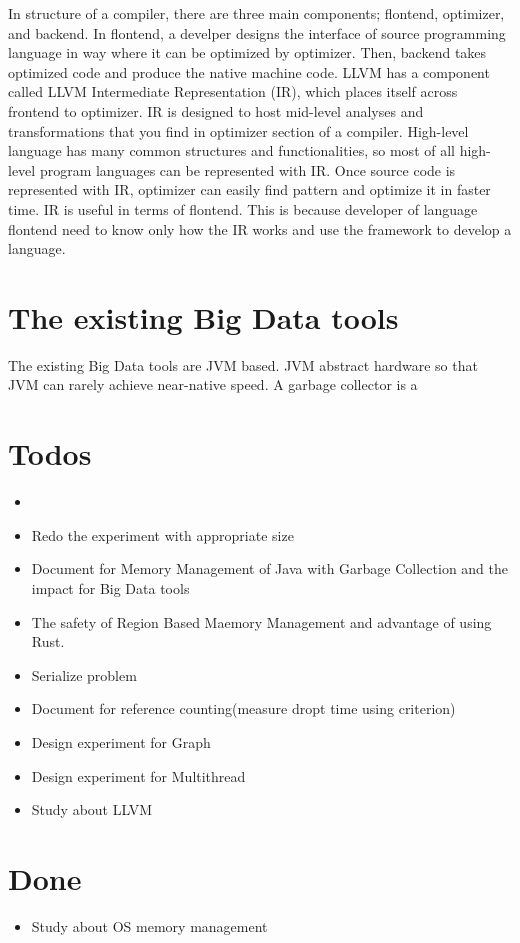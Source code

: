 In structure of a compiler, there are three main components; flontend, optimizer, and backend. 
In flontend, a develper designs the interface of source programming language in way where it can be optimized by optimizer. 
Then, backend takes optimized code and produce the native machine code. LLVM has a component called LLVM Intermediate Representation (IR), 
which places itself across frontend to optimizer. IR is designed to host mid-level analyses and transformations that you find in optimizer section of a compiler.
High-level language has many common structures and functionalities, so most of all high-level program languages can be represented with IR. 
Once source code is represented with IR, optimizer can easily find pattern and optimize it in faster time. 
IR is useful in terms of flontend. This is because developer of language flontend need to know only how the IR works and use the framework to develop a language.

\section{The existing Big Data tools}
\label{sec:history}
The existing Big Data tools are JVM based. JVM abstract hardware so that JVM can rarely achieve near-native speed. A garbage collector is a



\section{Todos}
\label{sec:history}
\begin{itemize}
    \item 
    \item Redo the experiment with appropriate size
    \item Document for Memory Management of Java with Garbage Collection and the impact for Big Data tools
    \item The safety of Region Based Maemory Management and advantage of using Rust.
    \item Serialize problem 
    \item Document for reference counting(measure dropt time using criterion)
    \item Design experiment for Graph
    \item Design experiment for Multithread
    \item Study about LLVM
\end{itemize}

\section{Done}
\label{sec:history}
\begin{itemize}
    \item Study about OS memory management
\end{itemize}


